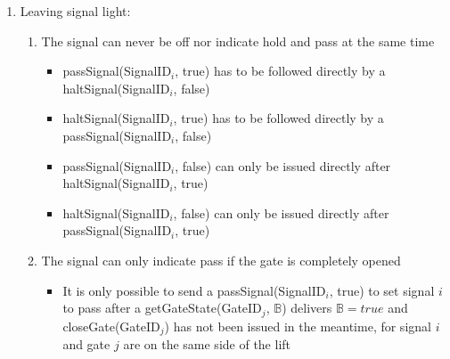 \begin{enumerate}
\begin{enumerate}
		\end{enumerate}
	\item Leaving signal light:
		\begin{enumerate}
			\item The signal can never be off nor indicate hold and pass at the same time
				\begin{itemize}
					\item passSignal(SignalID$_i$, true) has to be followed directly by a haltSignal(SignalID$_i$, false)
					\item haltSignal(SignalID$_i$, true) has to be followed directly by a passSignal(SignalID$_i$, false)
					\item passSignal(SignalID$_i$, false) can only be issued directly after haltSignal(SignalID$_i$, true)
					\item haltSignal(SignalID$_i$, false) can only be issued directly after passSignal(SignalID$_i$, true)
				\end{itemize}
			\item The signal can only indicate pass if the gate is completely opened
				\begin{itemize}
					\item It is only possible to send a passSignal(SignalID$_i$, true) to set signal $i$ to pass after a getGateState(GateID$_j$, $ \mathbb{B} $) delivers $\mathbb{B} = true$ and closeGate(GateID$_j$) has not been issued in the meantime, for signal $i$ and gate $j$ are on the same side of the lift
				\end{itemize}
		\end{enumerate}
\end{enumerate}
